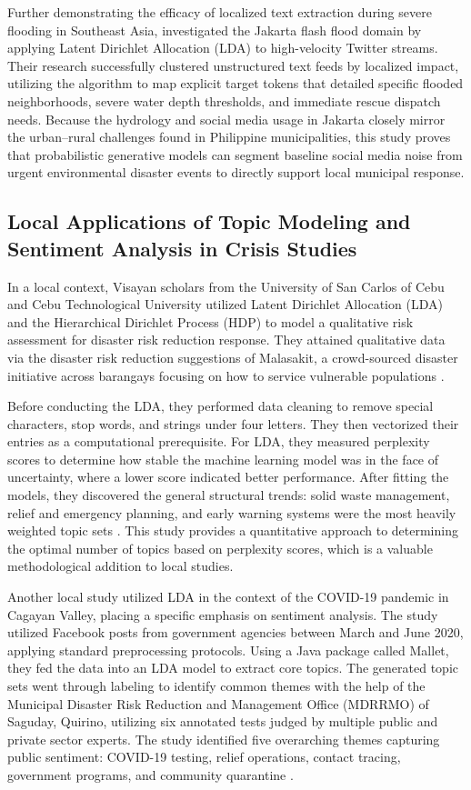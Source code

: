 \documentclass[12pt,a4paper]{report}
\begin{document}
Further demonstrating the efficacy of localized text extraction during severe
flooding in Southeast Asia, \parencite{rahmadan2020} investigated the Jakarta flash
flood domain by applying Latent Dirichlet Allocation (LDA) to high-velocity
Twitter streams. Their research successfully clustered unstructured text feeds
by localized impact, utilizing the algorithm to map explicit target tokens that
detailed specific flooded neighborhoods, severe water depth thresholds, and
immediate rescue dispatch needs. Because the hydrology and social media usage
in Jakarta closely mirror the urban--rural challenges found in Philippine
municipalities, this study proves that probabilistic generative models can
segment baseline social media noise from urgent environmental disaster events
to directly support local municipal response.

\subsection{Local Applications of Topic Modeling and Sentiment Analysis in
Crisis Studies}

In a local context, Visayan scholars from the University of San Carlos of Cebu
and Cebu Technological University utilized Latent Dirichlet Allocation (LDA)
and the Hierarchical Dirichlet Process (HDP) to model a qualitative risk
assessment for disaster risk reduction response. They attained qualitative data
via the disaster risk reduction suggestions of Malasakit, a crowd-sourced
disaster initiative across barangays focusing on how to service vulnerable
populations \parencite{gorro2021}.

Before conducting the LDA, they performed data cleaning to remove special
characters, stop words, and strings under four letters. They then vectorized
their entries as a computational prerequisite. For LDA, they measured
perplexity scores to determine how stable the machine learning model was in the
face of uncertainty, where a lower score indicated better performance. After
fitting the models, they discovered the general structural trends: solid waste
management, relief and emergency planning, and early warning systems were the
most heavily weighted topic sets \parencite{gorro2021}. This study provides a
quantitative approach to determining the optimal number of topics based on
perplexity scores, which is a valuable methodological addition to local
studies.

Another local study utilized LDA in the context of the COVID-19 pandemic in
Cagayan Valley, placing a specific emphasis on sentiment analysis. The study
utilized Facebook posts from government agencies between March and June 2020,
applying standard preprocessing protocols. Using a Java package called Mallet,
they fed the data into an LDA model to extract core topics. The generated topic
sets went through labeling to identify common themes with the help of the
Municipal Disaster Risk Reduction and Management Office (MDRRMO) of Saguday,
Quirino, utilizing six annotated tests judged by multiple public and private
sector experts. The study identified five overarching themes capturing public
sentiment: COVID-19 testing, relief operations, contact tracing, government
programs, and community quarantine \parencite{pagudpud2020}.
\end{document}
